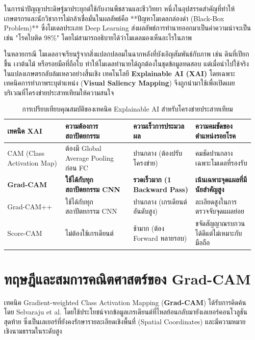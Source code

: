 ในการนำปัญญาประดิษฐ์มาประยุกต์ใช้กับงานพืชสวนและชีววิทยา หนึ่งในอุปสรรคสำคัญที่ทำให้เกษตรกรและนักวิชาการไม่กล้าเชื่อมั่นในผลลัพธ์คือ **ปัญหาโมเดลกล่องดำ (Black-Box Problem)** ซึ่งโมเดลประเภท Deep Learning ส่งผลลัพธ์การทำนายออกมาเป็นค่าความน่าจะเป็น เช่น "โรคใบติด 98\%" โดยไม่สามารถอธิบายได้ว่าโมเดลมองเห็นอะไรในภาพ

ในหลายกรณี โมเดลอาจเรียนรู้จากสิ่งแปลกปลอมในฉากหลังที่บังเอิญสัมพันธ์กับภาพ เช่น ดินที่เปียกชื้น เงาต้นไม้ หรือรอยมือที่ถือใบ ทำให้โมเดลทำนายได้ถูกต้องในชุดข้อมูลทดสอบ แต่เมื่อนำไปใช้จริงในแปลงเกษตรกลับล้มเหลวอย่างสิ้นเชิง เทคโนโลยี \textbf{Explainable AI (XAI)} โดยเฉพาะเทคนิคการทำภาพระบุตำแหน่ง (\textbf{Visual Saliency Mapping}) จึงถูกนำมาใช้เพื่อเปิดเผยบริเวณที่โครงข่ายประสาทเทียมให้ความสนใจ

\begin{table}[H]
\caption{การเปรียบเทียบคุณสมบัติของเทคนิค Explainable AI สำหรับโครงข่ายประสาทเทียม}
\label{tab:ch05_xai_comparison}
\begin{tabularx}{\textwidth}{L{3.2cm}L{3.0cm}L{3.2cm}Y}
\toprule
\textbf{เทคนิค XAI} & \textbf{ความต้องการสถาปัตยกรรม} & \textbf{ความเร็วการประมวลผล} & \textbf{ความคมชัดของตำแหน่งรอยโรค} \\
\midrule
CAM (Class Activation Map) & ต้องมี Global Average Pooling ก่อน FC & ปานกลาง (ต้องปรับโครงข่าย) & คมชัดปานกลางเฉพาะโมเดลที่รองรับ \\
\addlinespace
\textbf{Grad-CAM} & \textbf{ใช้ได้กับทุกสถาปัตยกรรม CNN} & \textbf{รวดเร็วมาก (1 Backward Pass)} & \textbf{เน้นเฉพาะจุดแผลที่มีนัยสำคัญสูง} \\
\addlinespace
Grad-CAM++ & ใช้ได้กับทุกสถาปัตยกรรม CNN & ปานกลาง (เกรเดียนต์อันดับสูง) & ละเอียดสูงในการตรวจจับจุดแผลย่อย \\
\addlinespace
Score-CAM & ไม่ต้องใช้เกรเดียนต์ & ช้ามาก (ต้อง Forward หลายรอบ) & ขจัดสัญญาณรบกวนได้ดีแต่ไม่เหมาะกับมือถือ \\
\bottomrule
\end{tabularx}
\end{table}

\section{ทฤษฎีและสมการคณิตศาสตร์ของ Grad-CAM}

เทคนิค Gradient-weighted Class Activation Mapping (\textbf{Grad-CAM}) ได้รับการคิดค้นโดย Selvaraju et al. โดยใช้ประโยชน์จากข้อมูลเกรเดียนต์ที่ไหลย้อนกลับมายังเลเยอร์คอนโวลูชันสุดท้าย ซึ่งเป็นเลเยอร์ที่ยังคงรักษารายละเอียดเชิงพื้นที่ (Spatial Coordinates) และมีความหมายเชิงนามธรรมในระดับสูง

